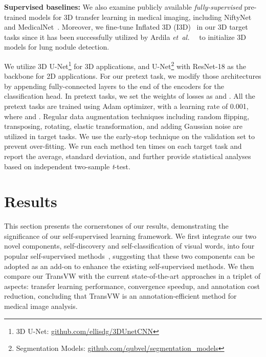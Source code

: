 \documentclass[journal,twoside,web]{ieeecolor}
\newcommand{\etal}{\mbox{\emph{et al.\ }}}
\begin{document}
\smallskip
\noindent\textbf{Supervised baselines:}  
We also examine publicly available {\em fully-supervised} pre-trained models for 3D transfer learning in medical imaging, including NiftyNet~\cite{gibson2018niftynet} and MedicalNet~\cite{chen2019med3d}.  Moreover, we fine-tune Inflated 3D (I3D)~\cite{carreira2017quo} in our 3D target tasks since it has been successfully utilized by Ardila \etal~\cite{ardila2019end} to initialize 3D models for lung nodule detection. 

We utilize 3D U-Net\footnote{\label{foot:3dunet}3D U-Net: \href{https://github.com/ellisdg/3DUnetCNN}{github.com/ellisdg/3DUnetCNN}} for 3D applications, and 
U-Net\footnote{\label{foot:densenet121}Segmentation Models: \href{https://github.com/qubvel/segmentation_models}{github.com/qubvel/segmentation\_models}} with  ResNet-18 as the backbone  for 2D applications. For our pretext task, we modify those architectures by appending fully-connected layers to the end of the encoders for the classification head.
In pretext tasks, we set the  weights of losses as  and .  All the pretext tasks are trained using Adam optimizer, with a learning rate of 0.001, where  and . Regular data augmentation techniques including random flipping, transposing, rotating, elastic transformation, and adding Gaussian noise are utilized in target tasks.  We use the early-stop technique on the validation set
to prevent over-fitting. We run each method ten times on each target task and report the average, standard deviation, and further provide statistical analyses based on independent two-sample \textit{t}-test.

\section{Results}
\label{sec:results}
 This section presents the cornerstones of our results, demonstrating the significance of our self-supervised learning framework. 
  We first integrate our two novel components, self-discovery and self-classification of visual words, into four popular self-supervised methods~\cite{gidaris2018unsupervised,pathak2016context,chen2019self,zhou2019models},  suggesting that these two components can be  adopted  as an add-on to  enhance the existing self-supervised methods. We then compare our TransVW with the current state-of-the-art approaches in a triplet of aspects:  transfer learning performance, convergence speedup, and annotation cost reduction, concluding that TransVW is an annotation-efficient method for medical image analysis. 
\end{document}
